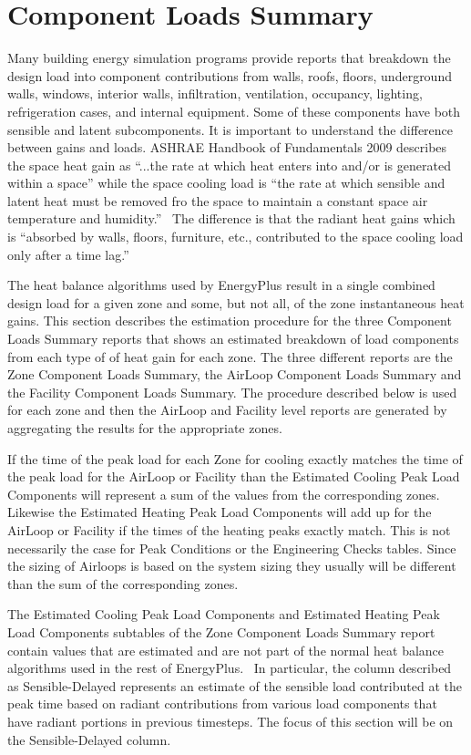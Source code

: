\section{Component Loads Summary}\label{component-loads-summary}

Many building energy simulation programs provide reports that breakdown the design load into component contributions from walls, roofs, floors, underground walls, windows, interior walls, infiltration, ventilation, occupancy, lighting, refrigeration cases, and internal equipment. Some of these components have both sensible and latent subcomponents. It is important to understand the difference between gains and loads. ASHRAE Handbook of Fundamentals 2009 describes the space heat gain as ``...the rate at which heat enters into and/or is generated within a space'' while the space cooling load is ``the rate at which sensible and latent heat must be removed fro the space to maintain a constant space air temperature and humidity.''~ The difference is that the radiant heat gains which is ``absorbed by walls, floors, furniture, etc., contributed to the space cooling load only after a time lag.''

The heat balance algorithms used by EnergyPlus result in a single combined design load for a given zone and some, but not all, of the zone instantaneous heat gains. This section describes the estimation procedure for the three Component Loads Summary reports that shows an estimated breakdown of load components from each type of of heat gain for each zone. The three different reports are the Zone Component Loads Summary, the AirLoop Component Loads Summary and the Facility Component Loads Summary. The procedure described below is used for each zone and then the AirLoop and Facility level reports are generated by aggregating the results for the appropriate zones.

If the time of the peak load for each Zone for cooling exactly matches the time of the peak load for the AirLoop or Facility than the Estimated Cooling Peak Load Components will represent a sum of the values from the corresponding zones. Likewise the Estimated Heating Peak Load Components will add up for the AirLoop or Facility if the times of the heating peaks exactly match. This is not necessarily the case for Peak Conditions or the Engineering Checks tables. Since the sizing of Airloops is based on the system sizing they usually will be different than the sum of the corresponding zones.

The Estimated Cooling Peak Load Components and Estimated Heating Peak Load Components subtables of the Zone Component Loads Summary report contain values that are estimated and are not part of the normal heat balance algorithms used in the rest of EnergyPlus.~ In particular, the column described as Sensible-Delayed represents an estimate of the sensible load contributed at the peak time based on radiant contributions from various load components that have radiant portions in previous timesteps. The focus of this section will be on the Sensible-Delayed column.

